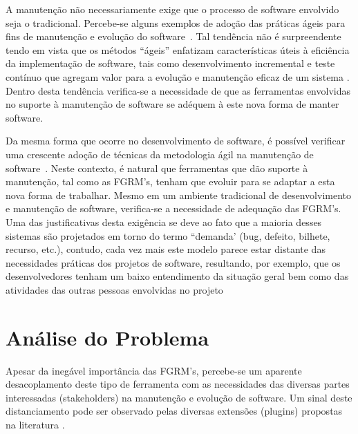 A manutenção não necessariamente exige que o processo de software envolvido
seja o tradicional. Percebe-se alguns exemplos de adoção das práticas ágeis
para fins de manutenção e evolução do software~\cite{kajko2009model, Heeager2015, Devulapally2015,Naz2016}. Tal
tendência não é surpreendente tendo em vista que os métodos ``ágeis'' enfatizam
características úteis à eficiência da implementação de software, tais como desenvolvimento incremental e teste contínuo que agregam valor para a evolução e manutenção eficaz de um sistema
\cite{thomas2006agile}. Dentro desta tendência verifica-se a necessidade de que as ferramentas envolvidas no suporte à manutenção de software se adéquem à este nova forma de manter software. 


Da mesma forma que ocorre no desenvolvimento de software, é possível verificar uma crescente adoção
de técnicas da metodologia ágil na manutenção de software~\cite{Soltan2016,Devulapally2015,
	Heeager2015}. Neste contexto, é natural que ferramentas que dão suporte à manutenção, tal como
as FGRM's, tenham que evoluir para se adaptar a esta nova forma de trabalhar. Mesmo em um ambiente
tradicional de  desenvolvimento e manutenção de software, verifica-se a necessidade de adequação das
FGRM's. Uma das justificativas desta exigência se deve ao fato que a maioria desses sistemas são
projetados em torno do termo ``demanda' (bug, defeito, bilhete, recurso, etc.), contudo, cada vez
mais este modelo parece estar distante das necessidades práticas dos projetos de software,
resultando, por exemplo, que os desenvolvedores tenham um
baixo entendimento da situação geral bem como das atividades das outras pessoas envolvidas no
projeto~\cite{Baysal:2013:SAP:2486788.2486957}


\section{Análise do Problema}
\label{sec:intro-problema}


Apesar da inegável importância das FGRM's, percebe-se um aparente desacoplamento deste tipo de
ferramenta com as necessidades das diversas partes interessadas (stakeholders) na manutenção e
evolução de software. Um sinal deste distanciamento pode ser observado pelas diversas extensões
(plugins) propostas na literatura
\cite{101186,Thung:2014:BIT:2635868.2661678,Kononenko:2014:DED:2591062.2591075}.
 
